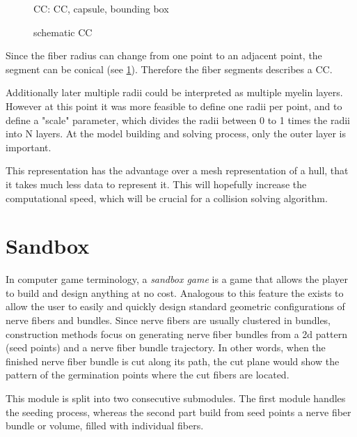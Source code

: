 % 
\begin{figure}[!t]
    \centering
    \setlength{\tikzwidth}{0.75\textwidth}
    \tikzset{external/export=false}
	\caption[cc and co]{\Acf{CC}:  \ac{CC},  capsule,  bounding box }
	\label{fig:conical_capsule}
\end{figure}
% 
\begin{figure}[!t]
    \centering
    \setlength{\tikzwidth}{0.5\textwidth}
	\caption{schematic  \ac{CC}}
	\label{fig:conical}
\end{figure}
% 
Since the fiber radius can change from one point to an adjacent point, the segment can be conical (see \cref{fig:conical_capsule}).
Therefore the fiber segments describes a \ac{CC}.
\par
% 
Additionally later multiple radii could be interpreted as multiple myelin layers.
However at this point it was more feasible to define one radii per point, and to define a "scale" parameter, which divides the radii between 0 to 1 times the radii into N layers.
At the model building and solving process, only the outer layer is important.
\par
% 
This representation has the advantage over a mesh representation of a hull, that it takes much less data to represent it.
This will hopefully increase the computational speed, which will be crucial for a collision solving algorithm.
% 
\section{Sandbox}\label{sec:sandbox}
% 
In computer game terminology, a \textit{sandbox game} is a game that allows the player to build and design anything at no cost.
Analogous to this feature the  exists to allow the user to easily and quickly design standard geometric configurations of nerve fibers and bundles.
Since nerve fibers are usually clustered in bundles, construction methods focus on generating nerve fiber bundles from a 2d pattern (seed points) and a nerve fiber bundle trajectory.
In other words, when the finished nerve fiber bundle is cut along its path, the cut plane would show the pattern of the germination points where the cut fibers are located.
% 
\par
% 
This module is split into two consecutive submodules.
The first module handles the seeding process, whereas the second part build from seed points a nerve fiber bundle or volume, filled with individual fibers.
% 
